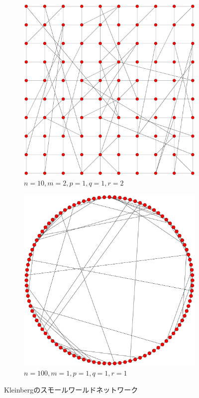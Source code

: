 \documentclass[dvipdfmx]{ampbt}
\begin{document}
   \begin{figure}[htbp]
    \centering
    \begin{subfigure}[b]{0.48\textwidth}
        \includegraphics[width=\textwidth]{../fig/kleinberg_2dim.eps}
     \caption{$n=10,m=2,p=1,q=1,r=2$}
    \end{subfigure}
    \begin{subfigure}[b]{0.48\textwidth}
        \includegraphics[width=\textwidth]{../fig/kleinberg_1dim.eps}
        \caption{$n=100,m=1,p=1,q=1,r=1$}
    \end{subfigure}
    \caption{Kleinbergのスモールワールドネットワーク}
    \label{fig:kleinberg}
   \end{figure}
\end{document}
